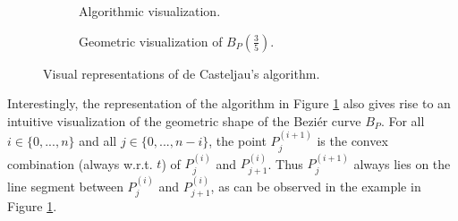\documentclass[a4paper, 11pt]{report}
\theoremstyle{definition}
\begin{document}
	\begin{figure}[H]
		\centering
		\begin{subfigure}{0.49\textwidth}
			\caption{Algorithmic visualization.}
		\end{subfigure}
		\hfill
		\begin{subfigure}{0.49\textwidth}
			
			\caption{Geometric visualization of $B_P(\frac{3}{5})$.}
		\end{subfigure}
		\caption{Visual representations of de Casteljau's algorithm.}
		\label{fig:decasteljautriangle}
	\end{figure}

	Interestingly, the representation of the algorithm in Figure \ref{fig:decasteljautriangle} also gives rise to an intuitive visualization of the geometric shape of the Beziér curve $B_P$. For all $i \in \{0, ..., n\}$ and all $j \in \{0, ..., n-i\}$, the point $P^{(i+1)}_j$ is the convex combination (always w.r.t. $t$) of $P^{(i)}_j$ and $P^{(i)}_{j+1}$. Thus $P^{(i+1)}_j$ always lies on the line segment between $P^{(i)}_j$ and $P^{(i)}_{j+1}$, as can be observed in the example in Figure \ref{fig:decasteljautriangle}.
\end{document}

